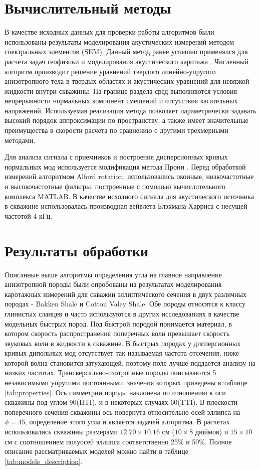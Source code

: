 \documentclass[a4paper,11pt]{article}
\begin{document}
\section{Вычислительный методы}

В качестве исходных данных для проверки работы алгоритмов были использованы результаты моделирования акустических измерений методом спектральных элементов (SEM). Данный метод ранее успешно применялся для расчета задач геофизики \cite{Komatitsch1999} и моделирования акустического каротажа \cite{Charara2011}. Численный алгоритм производит решение уравнений твердого линейно-упругого анизотропного тела в твердых областях и акустических уравнений для невязкой жидкости внутри скважины. На границе раздела сред выполняются условия непрерывности нормальных компонент смещений и отсутствия касательных напряжений. Используемая реализация метода позволяет параметрически задавать высокий порядок аппроксимации по пространству, а также имеет значительные преимущества в скорости расчета по сравнению с другими трехмерными методами.

Для анализа сигнала с приемников и построения дисперсионных кривых нормальных мод используется модификация метода Прони \cite{Ekstrom1995}. Перед обработкой измерений алгоритмом Alford rotation, использовались оконные, низкочастотные и высокочастотные фильтры, построенные с помощью вычислительного комплекса MATLAB. В качестве исходного сигнала для акустического источника в скважине использовалась производная вейвлета Блэкмана-Харриса с несущей частотой 4 кГц. 

\section{Результаты обработки}

Описанные выше алгоритмы определения угла на главное направление анизотропной породы были опробованы на результатах моделирования каротажных измерений для скважин эллиптического сечения в двух различных породах - Bakken Shale и Cotton Valey Shale. Обе породы относятся к классу глинистых сланцев и часто используются в других исследованиях в качестве модельных быстрых пород. Под быстрой породой понимается материал, в котором скорость распространения поперечных волн превышает скорость звуковых волн в жидкости в скважине. В быстрых породах у дисперсионных кривых дипольных мод отсутствует так называемая частота отсечения, ниже которой волна становится затухающей, поэтому поле лучше поддается анализу на низких частотах. Трансверсально-изотропные породы описываются 5 независимыми упругими постоянными, значения которых приведены в таблице \ref{tab:properties}. Ось симметрии породы наклонена по отношению к оси скважины под углом 90\textdegree (HTI), и в некоторых случаях 60\textdegree (TTI). В плоскости поперечного сечения скважины ось повернута относительно осей эллипса на $\phi = 45$\textdegree, определение этого угла и является задачей алгоритма. В расчетах использовались скважины размерами $12.70 \times 10.16$ см ($10 \times 8$ дюймов) и $15 \times 10$ см с соотношением полуосей эллипса соответственно 25\% и 50\%. Полное описание рассматриваемых моделей можно найти в таблице \ref{tab:models_description}. 
\end{document}
